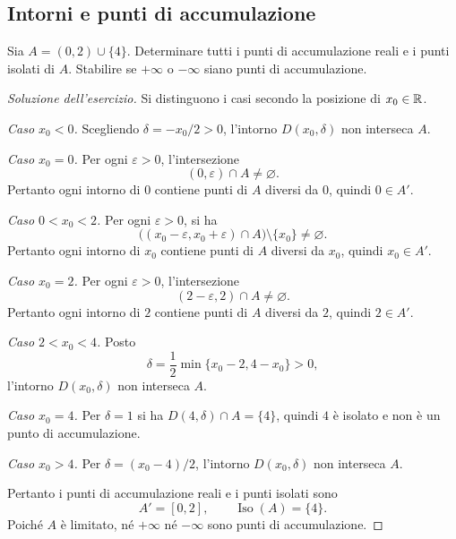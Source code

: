 \subsection{Intorni e punti di accumulazione}
\label{sec:esercizi-fondamenti-intorni}

\begin{exercise}
\label{ex:fondamenti-punto-isolato-intervallo}
Sia $A=(0,2)\cup\{4\}$. Determinare tutti i punti di
accumulazione reali e i punti isolati di $A$.
Stabilire se $+\infty$ o $-\infty$ siano punti di accumulazione.
\end{exercise}
\begin{proof}[Soluzione dell'esercizio]
Si distinguono i casi secondo la posizione di $x_0\in\mathbb{R}$.

\emph{Caso $x_0<0$.} Scegliendo $\delta=-x_0/2>0$,
l'intorno $D(x_0,\delta)$ non interseca $A$.

\emph{Caso $x_0=0$.} Per ogni $\varepsilon>0$,
l'intersezione
\[
  (0,\varepsilon)\cap A\ne\varnothing.
\]
Pertanto ogni intorno di $0$ contiene
punti di $A$ diversi da $0$, quindi $0\in A'$.

\emph{Caso $0<x_0<2$.} Per ogni $\varepsilon>0$,
si ha
\[
  \bigl((x_0-\varepsilon,x_0+\varepsilon)\cap A\bigr)
  \setminus\{x_0\}\ne\varnothing.
\]
Pertanto ogni intorno di $x_0$ contiene punti di
$A$ diversi da $x_0$, quindi $x_0\in A'$.

\emph{Caso $x_0=2$.} Per ogni $\varepsilon>0$,
l'intersezione
\[
  (2-\varepsilon,2)\cap A\ne\varnothing.
\]
Pertanto ogni intorno di $2$ contiene
punti di $A$ diversi da $2$, quindi $2\in A'$.

\emph{Caso $2<x_0<4$.} Posto
\[
  \delta=\frac12\min\{x_0-2,4-x_0\}>0,
\]
l'intorno $D(x_0,\delta)$ non interseca $A$.

\emph{Caso $x_0=4$.} Per $\delta=1$ si ha
$D(4,\delta)\cap A=\{4\}$, quindi $4$ è isolato
e non è un punto di accumulazione.

\emph{Caso $x_0>4$.} Per $\delta=(x_0-4)/2$,
l'intorno $D(x_0,\delta)$ non interseca $A$.

Pertanto i punti di accumulazione reali e i punti isolati sono
\[
  A'=[0,2],\qquad \operatorname{Iso}(A)=\{4\}.
\]
Poiché $A$ è limitato, né $+\infty$ né $-\infty$
sono punti di accumulazione.
\end{proof}

